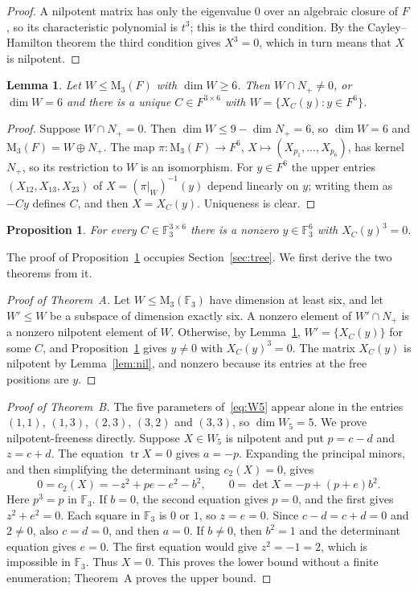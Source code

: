 \documentclass[screen]{aomart}
\newtheorem{proposition}[theorem]{Proposition}
\newtheorem{lemma}[theorem]{Lemma}
\theoremstyle{definition}
\theoremstyle{remark}
\numberwithin{equation}{section}
\newcommand{\F}{\mathbb{F}}
\newcommand{\M}{\mathrm{M}}
\newcommand{\tr}{\operatorname{tr}}
\begin{document}
\begin{proof}
A nilpotent matrix has only the eigenvalue $0$ over an algebraic closure of $F$, so its characteristic polynomial is $t^3$; this is the third condition. By the Cayley--Hamilton theorem the third condition gives $X^3=0$, which in turn means that $X$ is nilpotent.
\end{proof}

\begin{lemma}\label{lem:graph}
Let $W\le\M_3(F)$ with $\dim W\ge6$. Then $W\cap N_+\ne0$, or $\dim W=6$ and there is a unique $C\in F^{3\times6}$ with $W=\{X_C(y):y\in F^6\}$.
\end{lemma}

\begin{proof}
Suppose $W\cap N_+=0$. Then $\dim W\le 9-\dim N_+=6$, so $\dim W=6$ and $\M_3(F)=W\oplus N_+$. The map $\pi\colon\M_3(F)\to F^6$, $X\mapsto (X_{p_1},\dots,X_{p_6})$, has kernel $N_+$, so its restriction to $W$ is an isomorphism. For $y\in F^6$ the upper entries $(X_{12},X_{13},X_{23})$ of $X=(\pi|_W)^{-1}(y)$ depend linearly on $y$; writing them as $-Cy$ defines $C$, and then $X=X_C(y)$. Uniqueness is clear.
\end{proof}

\begin{proposition}\label{prop:finite}
For every $C\in\F_3^{3\times6}$ there is a nonzero $y\in\F_3^6$ with $X_C(y)^3=0$.
\end{proposition}

The proof of Proposition~\ref{prop:finite} occupies Section~\ref{sec:tree}. We first derive the two theorems from it.

\begin{proof}[Proof of Theorem~A]
Let $W\le\M_3(\F_3)$ have dimension at least six, and let $W'\le W$ be a subspace of dimension exactly six. A nonzero element of $W'\cap N_+$ is a nonzero nilpotent element of $W$. Otherwise, by Lemma~\ref{lem:graph}, $W'=\{X_C(y)\}$ for some $C$, and Proposition~\ref{prop:finite} gives $y\ne0$ with $X_C(y)^3=0$. The matrix $X_C(y)$ is nilpotent by Lemma~\ref{lem:nil}, and nonzero because its entries at the free positions are $y$.
\end{proof}

\begin{proof}[Proof of Theorem~B]
The five parameters of~\eqref{eq:W5} appear alone in the entries $(1,1)$, $(1,3)$, $(2,3)$, $(3,2)$ and $(3,3)$, so $\dim W_5=5$. We prove nilpotent-freeness directly. Suppose $X\in W_5$ is nilpotent and put $p=c-d$ and $z=c+d$. The equation $\tr X=0$ gives $a=-p$. Expanding the principal minors, and then simplifying the determinant using $c_2(X)=0$, gives
\[
0=c_2(X)=-z^2+pe-e^2-b^2,\qquad
0=\det X=-p+(p+e)b^2.
\]
Here $p^3=p$ in $\F_3$. If $b=0$, the second equation gives $p=0$, and the first gives $z^2+e^2=0$. Each square in $\F_3$ is $0$ or $1$, so $z=e=0$. Since $c-d=c+d=0$ and $2\ne0$, also $c=d=0$, and then $a=0$. If $b\ne0$, then $b^2=1$ and the determinant equation gives $e=0$. The first equation would give $z^2=-1=2$, which is impossible in $\F_3$. Thus $X=0$. This proves the lower bound without a finite enumeration; Theorem~A proves the upper bound.
\end{proof}
\end{document}
